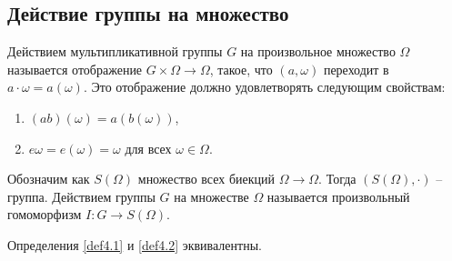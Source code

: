 \subsection{Действие группы на множество}

\begin{definition}
    \label{def4.1}
    Действием мультипликативной группы $G$ на произвольное множество $\Omega$ называется отображение
    $G \times \Omega \to \Omega$, такое, что $(a, \omega)$ переходит в $a \cdot \omega = a(\omega)$.
    Это отображение должно удовлетворять следующим свойствам:
    \begin{enumerate}
        \item $(ab)(\omega) = a(b(\omega))$,
        \item $e \omega = e(\omega) = \omega$ для всех $\omega \in \Omega$.
    \end{enumerate}
\end{definition}

\begin{definition}
    \label{def4.2}
    Обозначим как $S(\Omega)$ множество всех биекций $\Omega \to \Omega$. Тогда $(S(\Omega), \cdot)$ -- 
    группа. Действием группы $G$ на множестве $\Omega$ называется произвольный гомоморфизм $I: G \to S(\Omega)$.
\end{definition}

\begin{theorem}
    Определения \ref{def4.1} и \ref{def4.2} эквивалентны.
\end{theorem}

